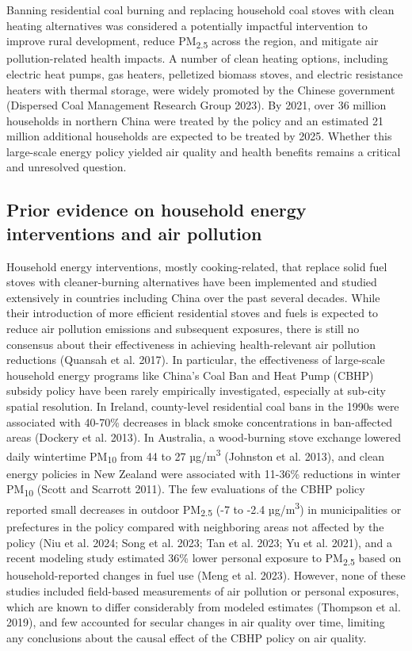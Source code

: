 \documentclass[
  letterpaper,
  DIV=11,
  numbers=noendperiod]{scrartcl}
\begin{document}
Banning residential coal burning and replacing household coal stoves
with clean heating alternatives was considered a potentially impactful
intervention to improve rural development, reduce PM\textsubscript{2.5}
across the region, and mitigate air pollution-related health impacts. A
number of clean heating options, including electric heat pumps, gas
heaters, pelletized biomass stoves, and electric resistance heaters with
thermal storage, were widely promoted by the Chinese government
(Dispersed Coal Management Research Group 2023). By 2021, over 36
million households in northern China were treated by the policy and an
estimated 21 million additional households are expected to be treated by
2025. Whether this large-scale energy policy yielded air quality and
health benefits remains a critical and unresolved question.

\hypertarget{prior-evidence-on-household-energy-interventions-and-air-pollution}{%
\subsection{Prior evidence on household energy interventions and air
pollution}\label{prior-evidence-on-household-energy-interventions-and-air-pollution}}

Household energy interventions, mostly cooking-related, that replace
solid fuel stoves with cleaner-burning alternatives have been
implemented and studied extensively in countries including China over
the past several decades. While their introduction of more efficient
residential stoves and fuels is expected to reduce air pollution
emissions and subsequent exposures, there is still no consensus about
their effectiveness in achieving health-relevant air pollution
reductions (Quansah et al. 2017). In particular, the effectiveness of
large-scale household energy programs like China's Coal Ban and Heat
Pump (CBHP) subsidy policy have been rarely empirically investigated,
especially at sub-city spatial resolution. In Ireland, county-level
residential coal bans in the 1990s were associated with 40-70\%
decreases in black smoke concentrations in ban-affected areas (Dockery
et al. 2013). In Australia, a wood-burning stove exchange lowered daily
wintertime PM\textsubscript{10} from 44 to 27 µg/m\textsuperscript{3}
(Johnston et al. 2013), and clean energy policies in New Zealand were
associated with 11-36\% reductions in winter PM\textsubscript{10} (Scott
and Scarrott 2011). The few evaluations of the CBHP policy reported
small decreases in outdoor PM\textsubscript{2.5} (-7 to -2.4
µg/m\textsuperscript{3}) in municipalities or prefectures in the policy
compared with neighboring areas not affected by the policy (Niu et al.
2024; Song et al. 2023; Tan et al. 2023; Yu et al. 2021), and a recent
modeling study estimated 36\% lower personal exposure to
PM\textsubscript{2.5} based on household-reported changes in fuel use
(Meng et al. 2023). However, none of these studies included field-based
measurements of air pollution or personal exposures, which are known to
differ considerably from modeled estimates (Thompson et al. 2019), and
few accounted for secular changes in air quality over time, limiting any
conclusions about the causal effect of the CBHP policy on air quality.
\end{document}
